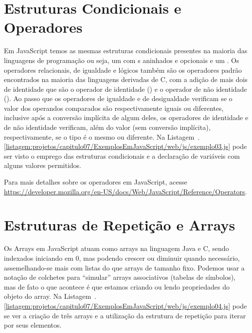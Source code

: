 \section{Estruturas Condicionais e Operadores}

Em JavaScript temos as mesmas estruturas condicionais presentes na maioria das linguagens de programação ou seja, um  com s aninhados e opcionais e um . Os operadores relacionais, de igualdade e lógicos também são os operadores padrão encontrados na maioria das linguagens derivadas de C, com a adição de mais dois de identidade que são o operador de identidade (\inlineJavaScriptCode{===}) e o operador de não identidade (\inlineJavaScriptCode{!==}). Ao passo que os operadores de igualdade e de desigualdade verificam se o valor dos operandos comparados são respectivamente iguais ou diferentes, inclusive após a conversão implícita de algum deles, os operadores de identidade e de não identidade verificam, além do valor (sem conversão implícita), respectivamente, se o tipo é o mesmo ou diferente. Na Listagem~\thechapter.\ref{listagem:projetos/capitulo07/ExemplosEmJavaScript/web/js/exemplo03.js} pode ser visto o emprego das estruturas condicionais e a declaração de variáveis com alguns valores permitidos.


\begin{saibaMais}
    Para mais detalhes sobre os operadores em JavaScript, acesse \url{https://developer.mozilla.org/en-US/docs/Web/JavaScript/Reference/Operators}.
\end{saibaMais}


\section{Estruturas de Repetição e Arrays}

Os Arrays em JavaScript atuam como arrays na linguagem Java e C, sendo indexados iniciando em 0, mas podendo crescer ou diminuir quando necessário, assemelhando-se mais com listas do que arrays de tamanho fixo. Podemos usar a notação de colchetes para ``simular'' arrays associativos (tabelas de símbolos), mas de fato o que acontece é que estamos criando ou lendo propriedades do objeto do array. Na Listagem~\thechapter.\ref{listagem:projetos/capitulo07/ExemplosEmJavaScript/web/js/exemplo04.js} pode se ver a criação de três arrays e a utilização da estrutura de repetição  para iterar por seus elementos.

